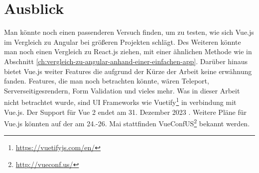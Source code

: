 
\chapter{Ausblick}
Man könnte noch einen passenderen Versuch finden, um zu testen,
wie sich Vue.js im Vergleich zu Angular bei größeren Projekten schlägt.
Des Weiteren könnte man noch einen Vergleich zu React.js ziehen,
mit einer ähnlichen Methode wie in Abschnitt \ref{ch:vergleich-zu-angular-anhand-einer-einfachen-app}.
Darüber hinaus bietet Vue.js weiter Features die aufgrund der Kürze der Arbeit keine erwähnung fanden.
Features, die man noch betrachten könnte, wären Teleport, Serverseitigesrendern, Form Validation und vieles mehr.
Was in dieser Arbeit nicht betrachtet wurde, sind UI Frameworks wie Vuetify\footnote{\url{https://vuetifyjs.com/en/}} in verbindung mit Vue.js.
Der Support für Vue 2 endet am 31. Dezember 2023 \cite{vueFAQ}.
Weitere Pläne für Vue.js könnten auf der am 24.-26. Mai stattfinden VueConfUS\footnote{\url{http://vueconf.us/}} bekannt werden.